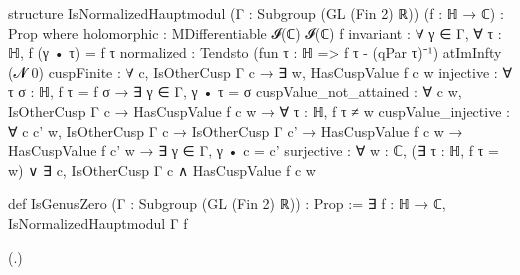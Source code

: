 \begin{leancode}
structure IsNormalizedHauptmodul (Γ : Subgroup (GL (Fin 2) ℝ)) (f : ℍ → ℂ) : Prop where
  holomorphic : MDifferentiable 𝓘(ℂ) 𝓘(ℂ) f
  invariant : ∀ γ ∈ Γ, ∀ τ : ℍ, f (γ • τ) = f τ
  normalized : Tendsto (fun τ : ℍ => f τ - (qPar τ)⁻¹) atImInfty (𝓝 0)
  cuspFinite : ∀ c, IsOtherCusp Γ c → ∃ w, HasCuspValue f c w
  injective : ∀ τ σ : ℍ, f τ = f σ → ∃ γ ∈ Γ, γ • τ = σ
  cuspValue_not_attained :
    ∀ c w, IsOtherCusp Γ c → HasCuspValue f c w → ∀ τ : ℍ, f τ ≠ w
  cuspValue_injective : ∀ c c' w, IsOtherCusp Γ c → IsOtherCusp Γ c' →
    HasCuspValue f c w → HasCuspValue f c' w → ∃ γ ∈ Γ, γ • c = c'
  surjective : ∀ w : ℂ, (∃ τ : ℍ, f τ = w) ∨ ∃ c, IsOtherCusp Γ c ∧ HasCuspValue f c w

def IsGenusZero (Γ : Subgroup (GL (Fin 2) ℝ)) : Prop :=
  ∃ f : ℍ → ℂ, IsNormalizedHauptmodul Γ f
\end{leancode}
(.)
